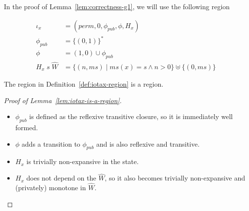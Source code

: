\documentclass[a4paper]{article}
\newcommand{\union}{\mathbin{\cup}}
\newcommand{\var}[1]{\mathit{#1}}
\newcommand{\hs}{\var{ms}}
\newcommand{\ms}{\hs}
\newcommand{\perm}{\var{perm}}
\newcommand{\pub}{\var{pub}}
\newcommand{\npair}[2][n]{\left(#1,#2 \right)}
\begin{document}
%
In the proof of Lemma~\ref{lem:correctness-g1}, we will use the following region
\begin{definition}
  \label{def:iotax-region}
  \begin{align*}
    \iota_x   & = (\perm, 0, \phi_\pub, \phi, H_x) \\
    \phi_\pub & = \{(0,1)\}^* \\
    \phi      & = (1,0) \union \phi_\pub \\
    H_x \; s \; \hat{W} & = \{\npair{\ms} \mid \ms(x) = s \land n > 0 \} \uplus \{\npair[0]{\ms}\}
  \end{align*}
\end{definition}
\begin{lemma}
  \label{lem:iotax-is-a-region}
  The region in Definition~\ref{def:iotax-region} is a region.
\end{lemma}
\begin{proof}[Proof of Lemma~\ref{lem:iotax-is-a-region}]
  \begin{itemize}
  \item $\phi_\pub$ is defined as the reflexive transitive closure, so it is immediately well formed.
  \item $\phi$ adds a transition to $\phi_\pub$ and is also reflexive and transitive. 
  \item $H_x$ is trivially non-expansive in the state.
  \item $H_x$ does not depend on the $\hat{W}$, so it also becomes trivially non-expansive and (privately) monotone in $\hat{W}$.
  \end{itemize}
\end{proof}
\end{document}
